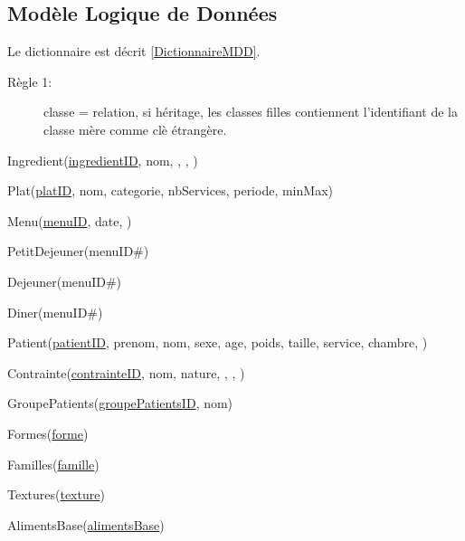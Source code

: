\subsection{Modèle Logique de Données}
Le dictionnaire est décrit \autoref{DictionnaireMDD}.
\begin{description}
\item[Règle 1:] classe = relation, si héritage, les classes filles contiennent l'identifiant de la classe mère comme clè étrangère.
\end{description}

Ingredient(\underline{ingredientID}, nom, , , )


Plat(\underline{platID}, nom, categorie, nbServices, periode, minMax)


Menu(\underline{menuID}, date, )

PetitDejeuner(menuID\#)

Dejeuner(menuID\#)

Diner(menuID\#)

Patient(\underline{patientID}, prenom, nom, sexe, age, poids, taille, service, chambre, )


Contrainte(\underline{contrainteID}, nom, nature, , , )


GroupePatients(\underline{groupePatientsID}, nom)

Formes(\underline{forme})

Familles(\underline{famille})

Textures(\underline{texture})

AlimentsBase(\underline{alimentsBase})


